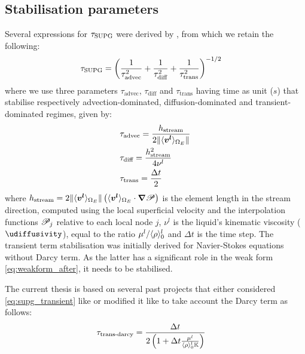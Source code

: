 \subsection{Stabilisation parameters}
Several expressions for $\tau_\text{SUPG}$ were derived by \citet{tezduyar_incompressible_1992,tezduyar_finite_2000}, from which
we retain the following:
\begin{align}
& \tau_\text{SUPG} = \left( \frac{1}{\tau_\text{advec}^2} + \frac{1}{\tau_\text{diff}^2} + \frac{1}{\tau_\text{trans}^2}  \right)^{-1/2}
\end{align}
where we use three parameters $\tau_\text{advec}$, $\tau_\text{diff}$ and $\tau_\text{trans}$ 
having time as unit ($s$) that stabilise respectively advection-dominated, diffusion-dominated and transient-dominated
regimes, given by:
\begin{align}
& \tau_\text{advec} = \frac{h_\text{stream}}{2 \lVert \langle \boldsymbol{v^l} \rangle_{\Omega_E} \rVert}  \\ 
& \tau_\text{diff} = \frac{h_\text{stream}^2}{4\nu^l}  \\ 
\label{eq:supg_transient}
& \tau_\text{trans} = \frac{\Delta t}{2}
\end{align}
where $h_\text{stream}=2\lVert \langle \boldsymbol{v^l} \rangle_{\Omega_E} \rVert\left( \langle \boldsymbol{v^l} \rangle_{\Omega_E} \cdot \boldsymbol{\nabla} \mathscr{P} \right)$ is the element length in the stream direction, computed using
the local superficial velocity and the interpolation functions $\mathscr{P}_j$ relative to each local node $j$,
$\nu^l$ is the liquid's kinematic viscosity ($\si{\udiffusivity}$), equal to the ratio $\mu^l/\langle \rho \rangle^l_0$
 and $\Delta t$ is the time step.
The transient term stabilisation was initially derived for Navier-Stokes equations without Darcy term.
As the latter has a significant role in the weak form \cref{eq:weakform_after}, it needs to be stabilised.

The current thesis is based on several past projects that either considered \cref{eq:supg_transient}
like \citet{liu_finite_2005} or modified it like \citet{gouttebroze_modelisation_2005,rivaux_simulation_2011} 
to take account the Darcy term as follows:
\begin{align}
\label{eq:supg_transient_darcy}
& \tau_\text{trans-darcy} = \frac{\Delta t}{2\left( 1+\Delta t \frac{\mu^l}{\langle \rho \rangle^l_0 \mathbb{K}} \right)}
\end{align}

